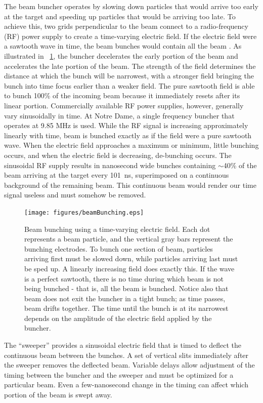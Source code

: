 The beam buncher operates by slowing down particles that would arrive too early at the target and speeding up particles that would be arriving too late.  To achieve this, two grids perpendicular to the beam connect to a radio-frequency (RF) power supply to create a time-varying electric field.  If the electric field were a sawtooth wave in time, the beam bunches would contain all the beam \citep{LynchBunching}.  As illustrated in {\fig}~\ref{fig:bunching}, the buncher decelerates the early portion of the beam and accelerates the late portion of the beam.  The strength of the field determines the distance at which the bunch will be narrowest, with a stronger field bringing the bunch into time focus earlier than a weaker field.  The pure sawtooth field is able to bunch 100\% of the incoming beam because it immediately resets after its linear portion.  Commercially available RF power supplies, however, generally vary sinusoidally in time.  At Notre Dame, a single frequency buncher that operates at 9.85 MHz is used.  While the RF signal is increasing approximately linearly with time, beam is bunched exactly as if the field were a pure sawtooth wave.  When the electric field approaches a maximum or minimum, little bunching occurs, and when the electric field is decreasing, de-bunching occurs.  The sinusoidal RF supply results in nanosecond wide bunches containing $\sim$40\% of the beam arriving at the target every 101~ns, superimposed on a continuous background of the remaining beam.  This continuous beam would render our time signal useless and must somehow be removed.

\begin{figure}[htp]
\centering
\texttt{[image: figures/beamBunching.eps]}
\caption{Beam bunching using a time-varying electric field.  Each dot represents a beam particle, and the vertical gray bars represent the bunching electrodes.  To bunch one section of beam, particles arriving first must be slowed down, while particles arriving last must be sped up.  A linearly increasing field does exactly this.  If the wave is a perfect sawtooth, there is no time during which beam is not being bunched - that is, all the beam is bunched.  Notice also that beam does not exit the buncher in a tight bunch; as time passes, beam drifts together.  The time until the bunch is at its narrowest depends on the amplitude of the electric field applied by the buncher.}
\label{fig:bunching}
\end{figure}

The ``sweeper'' provides a sinusoidal electric field that is timed to deflect the continuous beam between the bunches.  A set of vertical slits immediately after the sweeper removes the deflected beam.  Variable delays allow adjustment of the timing between the buncher and the sweeper and must be optimized for a particular beam.  Even a few-nanosecond change in the timing can affect which portion of the beam is swept away. 

